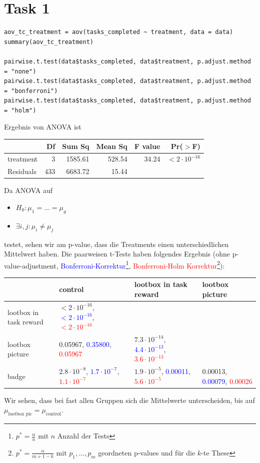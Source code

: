 \documentclass{article}
\begin{document}
	\section*{Task 1}
	\begin{lstlisting}
aov_tc_treatment = aov(tasks_completed ~ treatment, data = data)
summary(aov_tc_treatment)

pairwise.t.test(data$tasks_completed, data$treatment, p.adjust.method = "none")
pairwise.t.test(data$tasks_completed, data$treatment, p.adjust.method = "bonferroni")
pairwise.t.test(data$tasks_completed, data$treatment, p.adjust.method = "holm")
	\end{lstlisting}
	Ergebnis von ANOVA ist
	\begin{center}
		\begin{tabular}{lrrrrr}
  \hline
 & Df & Sum Sq & Mean Sq & F value & Pr($>$F) \\ 
  \hline
treatment & 3 & 1585.61 & 528.54 & 34.24 & $<2\cdot 10^{-16}$ \\ 
  Residuals & 433 & 6683.72 & 15.44 &  &  \\ 
   \hline
\end{tabular}
	\end{center}
	Da ANOVA auf
	\begin{itemize}
		\item $H_0: \mu_1 = \dots =\mu_g$
		\item $\exists i,j: \mu_i \neq \mu_j$
	\end{itemize}
	testet, sehen wir am p-value, dass die Treatments einen unterschiedlichen Mittelwert haben. Die paarweisen t-Tests haben folgendes Ergebnis (ohne p-value-adjustment, \textcolor{blue}{Bonferroni-Korrektur}\footnote{$p^\ast = \frac{\alpha}{n}$ mit $n$ Anzahl der Tests}, \textcolor{red}{Bonferroni-Holm Korrektur}\footnote{$p^\ast = \frac{\alpha}{m+1-k}$ mit $p_1,...,p_m$ geordneten p-values und für die $k$-te These}):
	\begin{center}
		\begin{tabular}{l|L{3.5cm}|L{3.5cm}|L{3.5cm}}
			& control & lootbox in task reward & lootbox picture \\
			\hline
			lootbox in task reward & $<2\cdot 10^{-16}$, \textcolor{blue}{$<2\cdot 10^{-16}$}, \textcolor{red}{$<2\cdot 10^{-16}$} & & \\
			\hline
			lootbox picture & 0.05967, \textcolor{blue}{0.35800}, \textcolor{red}{0.05967} & $7.3\cdot 10^{-14}$, \textcolor{blue}{$4.4\cdot 10^{-13}$}, \textcolor{red}{$3.6\cdot 10^{-13}$} & \\
			\hline
			badge & $2.8\cdot 10^{-8}$, \textcolor{blue}{$1.7\cdot 10^{-7}$}, \textcolor{red}{$1.1\cdot 10^{-7}$} & $1.9\cdot 10^{-5}$, \textcolor{blue}{0.00011}, \textcolor{red}{$5.6\cdot 10^{-5}$} & 0.00013, \textcolor{blue}{0.00079}, \textcolor{red}{0.00026}
		\end{tabular}
	\end{center}
	Wir sehen, dass bei fast allen Gruppen sich die Mittelwerte unterscheiden, bis auf $\mu_{\text{lootbox pic}} = \mu_{\text{control}}$.
\end{document}
